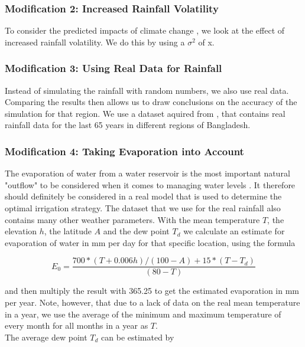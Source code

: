 \documentclass[12pt, a4paper, oneside]{article}
\begin{document}
\subsubsection{Modification 2: Increased Rainfall Volatility}
To consider the predicted impacts of climate change \citep{guhathakurta2011impact}, we look at the effect of increased rainfall volatility. 
We do this by using a  $\sigma^2$ of x.

\subsubsection{Modification 3: Using Real Data for Rainfall}
Instead of simulating the rainfall with random numbers, we also use real data.
Comparing the results then allows us to draw conclusions on the accuracy of the simulation for that region. 
We use a dataset aquired from \cite{kaggle:2019}, that contains real rainfall data for the last 65 years in different regions of Bangladesh. %

\subsubsection{Modification 4: Taking Evaporation into Account}
The evaporation of water from a water reservoir is the most important natural "outflow" to be considered when it comes to managing water levels \citep{tanny2008evaporation}.
It therefore should definitely be considered in a real model that is used to determine the optimal irrigation strategy.
The dataset that we use for the real rainfall also contains many other weather parameters.
With the mean temperature $T$, the elevation $h$, the latitude $A$ and the dew point $T_d$ we calculate an estimate for evaporation of water in mm per day for that specific location, using the formula \citep{linacre1977simple}

\begin{equation}
	{E_0} = \frac{700 * (T + 0.006h) / (100 - A) + 15 * (T - T_d)}{(80 - T)}
\end{equation}

and then multiply the result with 365.25 to get the estimated evaporation in mm per year. 
Note, however, that due to a lack of data on the real mean temperature in a year, we use the average of the minimum and maximum temperature of every month for all months in a year as $T$. \\
The average dew point $T_d$ can be estimated by 
\end{document}
